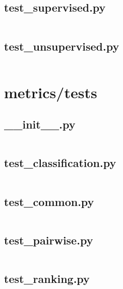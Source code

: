 \documentclass{article}
\begin{document}
\subsection{test\_supervised.py}
\inputminted{python}{/home/dufferzafar/dev/@clones/scikit-learn/sklearn/metrics/cluster/tests/test_supervised.py}
\newpage

\subsection{test\_unsupervised.py}
\inputminted{python}{/home/dufferzafar/dev/@clones/scikit-learn/sklearn/metrics/cluster/tests/test_unsupervised.py}
\newpage

\section{metrics/tests}

\subsection{\_\_init\_\_.py}
\inputminted{python}{/home/dufferzafar/dev/@clones/scikit-learn/sklearn/metrics/tests/__init__.py}
\newpage

\subsection{test\_classification.py}
\inputminted{python}{/home/dufferzafar/dev/@clones/scikit-learn/sklearn/metrics/tests/test_classification.py}
\newpage

\subsection{test\_common.py}
\inputminted{python}{/home/dufferzafar/dev/@clones/scikit-learn/sklearn/metrics/tests/test_common.py}
\newpage

\subsection{test\_pairwise.py}
\inputminted{python}{/home/dufferzafar/dev/@clones/scikit-learn/sklearn/metrics/tests/test_pairwise.py}
\newpage

\subsection{test\_ranking.py}
\inputminted{python}{/home/dufferzafar/dev/@clones/scikit-learn/sklearn/metrics/tests/test_ranking.py}
\newpage
\end{document}
